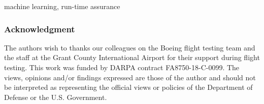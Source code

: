 \documentclass[conference]{IEEEtran}
\begin{document}
\begin{IEEEkeywords}
machine learning, run-time assurance
\end{IEEEkeywords}





















\subsubsection*{Acknowledgment}
The authors wish to thanks our colleagues on the Boeing flight testing team and the staff 
at the Grant County International Airport for their support during flight testing.  
This work was funded by DARPA contract  FA8750-18-C-0099. The views, opinions and/or
findings expressed are those of the author and should not be interpreted as representing
the official views or policies of the Department of Defense or the U.S. Government.



\end{document}
